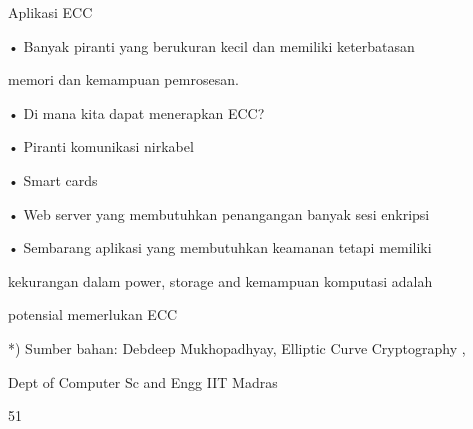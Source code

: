 \documentclass{article}
\begin{document}

Aplikasi ECC

• Banyak piranti yang berukuran kecil dan memiliki keterbatasan 

memori dan kemampuan pemrosesan.

• Di mana kita dapat menerapkan ECC?

• Piranti komunikasi nirkabel

• Smart cards

• Web server yang membutuhkan penangangan  banyak sesi enkripsi

• Sembarang aplikasi yang membutuhkan keamanan  tetapi memiliki 

kekurangan dalam power, storage and kemampuan komputasi adalah 

potensial memerlukan ECC

*) Sumber bahan: Debdeep Mukhopadhyay, Elliptic Curve Cryptography ,

 Dept of Computer Sc and Engg IIT Madras

51
\end{document}
